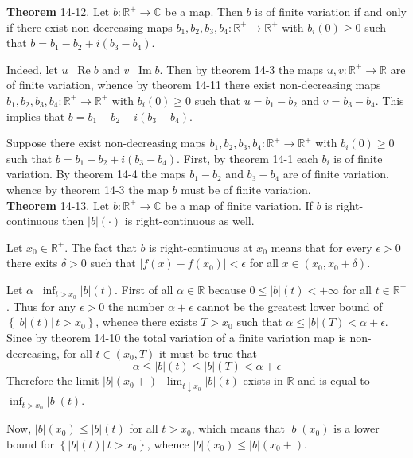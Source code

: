 \documentclass[a4paper]{article}
\newcommand{\obj}[1]{\left\{ #1 \right \}}
\newcommand{\brac}[1]{\left ( #1 \right )}
\newcommand{\induc}[1]{\left . #1 \right \vert}
\newcommand{\abs}[1]{\left | #1 \right |}
\newcommand{\Real}{\mathbb{R}}
\newcommand{\Cplx}{\mathbb{C}}
\newcommand{\defn}{\mathop{\overset{\Delta}{=}}\nolimits}
\newcommand{\re}{\operatorname{Re}\nolimits}
\newcommand{\im}{\operatorname{Im}\nolimits}
\begin{document}
\label{thm:cplx_tot_var_decomp}\noindent\textbf{Theorem} 14-12.
Let $b:\Real^+\to\Cplx$ be a map. Then $b$ is of finite variation if and only if there exist non-decreasing maps $b_1,b_2,b_3,b_4:\Real^+\to \Real^+$ with $b_i\brac{0}\geq 0$ such that $b=b_1-b_2+i\brac{b_3-b_4}$.

Indeed, let $u\defn \re b$ and $v\defn \im b$. Then by theorem 14-3 the maps $u,v:\Real^+\to\Real$ are of finite variation, whence by theorem 14-11 there exist non-decreasing maps $b_1,b_2,b_3,b_4:\Real^+\to \Real^+$ with $b_i\brac{0}\geq 0$ such that $u=b_1-b_2$ and $v=b_3-b_4$. This implies that $b=b_1-b_2+i\brac{b_3-b_4}$.

Suppose there exist non-decreasing maps $b_1,b_2,b_3,b_4:\Real^+\to \Real^+$ with $b_i\brac{0}\geq 0$ such that $b=b_1-b_2+i\brac{b_3-b_4}$. First, by theorem 14-1 each $b_i$ is of finite variation. By theorem 14-4 the maps $b_1-b_2$ and $b_3-b_4$ are of finite variation, whence by theorem 14-3 the map $b$ must be of finite variation.\\

\label{thm:tot_var_right_cont}\noindent\textbf{Theorem} 14-13.
Let $b:\Real^+\to\Cplx$ be a map of finite variation. If $b$ is right-continuous then $\abs{b}\brac{\cdot}$ is right-continuous as well.

Let $x_0\in \Real^+$. The fact that $b$ is right-continuous at $x_0$ means that for every $\epsilon>0$ there exits $\delta>0$ such that $\abs{f\brac{x}-f\brac{x_0}}<\epsilon$ for all $x\in\brac{x_0,x_0+\delta}$.

Let $\alpha\defn \inf_{t>x_0} \abs{b}\brac{t}$. First of all $\alpha\in \Real$ because $0\leq \abs{b}\brac{t}<+\infty$ for all $t\in \Real^+$. Thus for any $\epsilon>0$ the number $\alpha+\epsilon$ cannot be the greatest lower bound of $\obj{\induc{\abs{b}\brac{t}}\,t>x_0}$, whence there exists $T>x_0$ such that $\alpha\leq \abs{b}\brac{T}<\alpha+\epsilon$. Since by theorem 14-10 the total variation of a finite variation map is non-decreasing, for all $t\in\brac{x_0,T}$ it must be true that \[\alpha\leq \abs{b}\brac{t}\leq \abs{b}\brac{T}<\alpha+\epsilon\] Therefore the limit $\abs{b}\brac{x_0+}\defn \lim_{t\downarrow x_0} \abs{b}\brac{t}$ exists in $\Real$ and is equal to $\inf_{t>x_0} \abs{b}\brac{t}$.

Now, $\abs{b}\brac{x_0}\leq \abs{b}\brac{t}$ for all $t>x_0$, which means that $\abs{b}\brac{x_0}$ is a lower bound for $\obj{\induc{\abs{b}\brac{t}}\,t>x_0}$, whence $\abs{b}\brac{x_0}\leq \abs{b}\brac{x_0+}$.
\end{document}
